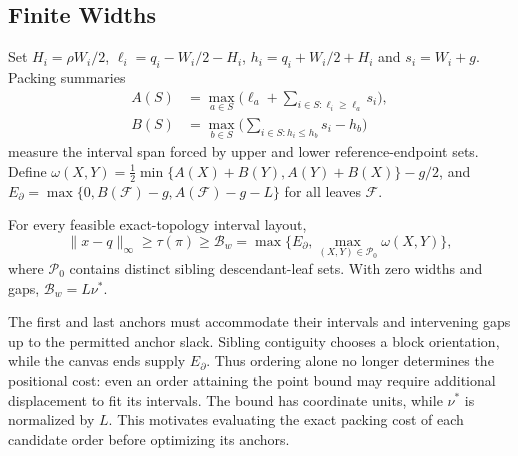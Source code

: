 \subsection{Finite Widths}
Set $H_i=\rho W_i/2$, $\ell_i=q_i-W_i/2-H_i$, $h_i=q_i+W_i/2+H_i$ and $s_i=W_i+g$. Packing summaries
\begin{equation}\label{eq:packing}
\begin{split}
A(S)&=\max_{a\in S}\bigl(\ell_a+\sum_{i\in S:\ell_i\ge\ell_a}s_i\bigr),\\
B(S)&=\max_{b\in S}\bigl(\sum_{i\in S:h_i\le h_b}s_i-h_b\bigr)
\end{split}
\end{equation}
measure the interval span forced by upper and lower reference-endpoint sets. Define $\omega(X,Y)=\tfrac12\min\{A(X)+B(Y),A(Y)+B(X)\}-g/2$, and $E_\partial=\max\{0,B(\mathcal F)-g,A(\mathcal F)-g-L\}$ for all leaves $\mathcal F$.
\begin{theorem}\label{thm:width}
For every feasible exact-topology interval layout,
\begin{equation}\label{eq:widthbound}
\|x-q\|_\infty\ge\tau(\pi)\ge\mathcal B_w
=\max\{E_\partial,\max_{(X,Y)\in\mathcal P_0}\omega(X,Y)\},
\end{equation}
where $\mathcal P_0$ contains distinct sibling descendant-leaf sets. With zero widths and gaps, $\mathcal B_w=L\nu^*$.
\end{theorem}
The first and last anchors must accommodate their intervals and intervening gaps up to the permitted anchor slack. Sibling contiguity chooses a block orientation, while the canvas ends supply $E_\partial$. Thus ordering alone no longer determines the positional cost: even an order attaining the point bound may require additional displacement to fit its intervals. The bound has coordinate units, while $\nu^*$ is normalized by $L$. This motivates evaluating the exact packing cost of each candidate order before optimizing its anchors.

